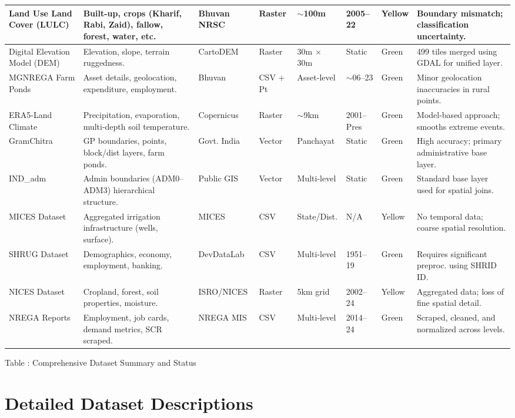 \documentclass[12pt,a4paper]{report}
\begin{document}
\begin{spacing}{1.5}
\begin{spacing}{1.0}
\begin{longtable}{|p{2.0cm}|p{2.2cm}|p{1.5cm}|p{1.0cm}|p{1.5cm}|p{1.0cm}|p{1.0cm}|p{2.5cm}|}
Land Use Land Cover (LULC) & Built-up, crops (Kharif, Rabi, Zaid), fallow, forest, water, etc. & Bhuvan NRSC & Raster & $\sim$100m & 2005--22 & Yellow & Boundary mismatch; classification uncertainty. \\ \hline
Digital Elevation Model (DEM) & Elevation, slope, terrain ruggedness. & CartoDEM & Raster & 30m $\times$ 30m & Static & Green & 499 tiles merged using GDAL for unified layer. \\ \hline
MGNREGA Farm Ponds & Asset details, geolocation, expenditure, employment. & Bhuvan & CSV + Pt & Asset-level & $\sim$06--23 & Green & Minor geolocation inaccuracies in rural points. \\ \hline
ERA5-Land Climate & Precipitation, evaporation, multi-depth soil temperature. & Copernicus & Raster & $\sim$9km & 2001--Pres & Green & Model-based approach; smooths extreme events. \\ \hline
GramChitra & GP boundaries, points, block/dist layers, farm ponds. & Govt. India & Vector & Panchayat & Static & Green & High accuracy; primary administrative base layer. \\ \hline
IND\_adm & Admin boundaries (ADM0--ADM3) hierarchical structure. & Public GIS & Vector & Multi-level & Static & Green & Standard base layer used for spatial joins. \\ \hline
MICES Dataset & Aggregated irrigation infrastructure (wells, surface). & MICES & CSV & State/Dist. & N/A & Yellow & No temporal data; coarse spatial resolution. \\ \hline
SHRUG Dataset & Demographics, economy, employment, banking. & DevDataLab & CSV & Multi-level & 1951--19 & Green & Requires significant preproc. using SHRID ID. \\ \hline
NICES Dataset & Cropland, forest, soil properties, moisture. & ISRO/NICES & Raster & 5km grid & 2002--24 & Yellow & Aggregated data; loss of fine spatial detail. \\ \hline
NREGA Reports & Employment, job cards, demand metrics, SCR scraped. & NREGA MIS & CSV & Multi-level & 2014--24 & Green & Scraped, cleaned, and normalized across levels. \\ \hline
\end{longtable}
\end{spacing}
\addtocounter{table}{1}
\begin{center}
    Table \thetable: Comprehensive Dataset Summary and Status
\end{center}

\section{Detailed Dataset Descriptions}


\end{spacing}
\end{document}
